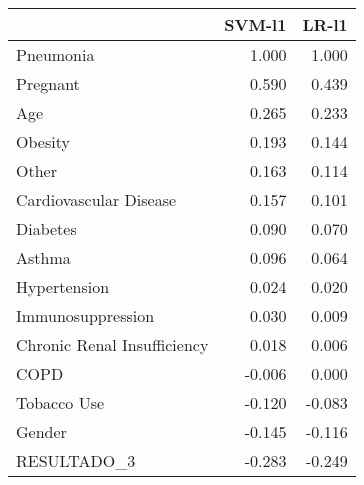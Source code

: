 \begin{tabular}{lrr}
\toprule
{} &  SVM-l1 &  LR-l1 \\
\midrule
Pneumonia                   &   1.000 &  1.000 \\
Pregnant                    &   0.590 &  0.439 \\
Age                         &   0.265 &  0.233 \\
Obesity                     &   0.193 &  0.144 \\
Other                       &   0.163 &  0.114 \\
Cardiovascular Disease      &   0.157 &  0.101 \\
Diabetes                    &   0.090 &  0.070 \\
Asthma                      &   0.096 &  0.064 \\
Hypertension                &   0.024 &  0.020 \\
Immunosuppression           &   0.030 &  0.009 \\
Chronic Renal Insufficiency &   0.018 &  0.006 \\
COPD                        &  -0.006 &  0.000 \\
Tobacco Use                 &  -0.120 & -0.083 \\
Gender                      &  -0.145 & -0.116 \\
RESULTADO\_3                 &  -0.283 & -0.249 \\
\bottomrule
\end{tabular}
